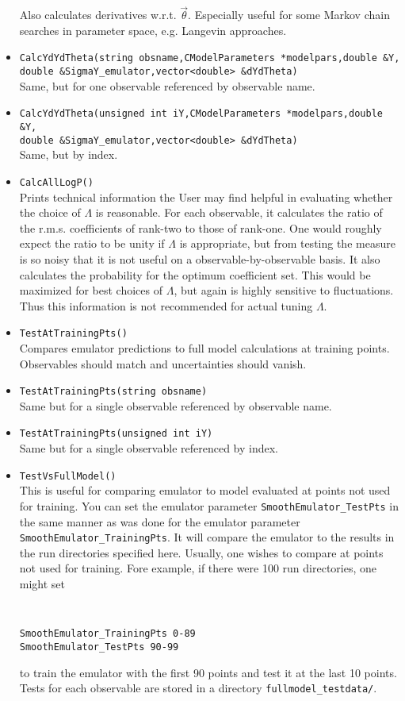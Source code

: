 \documentclass[UserManual.tex]{subfiles}
\begin{document}
\begin{itemize}
Also calculates derivatives w.r.t. $\vec{\theta}$. Especially useful for some Markov chain searches in parameter space, e.g. Langevin approaches.
\item {\tt CalcYdYdTheta(string obsname,CModelParameters *modelpars,double \&Y,\\double \&SigmaY\_emulator,vector<double> \&dYdTheta)}\\
Same, but for one observable referenced by observable name.
\item {\tt CalcYdYdTheta(unsigned int iY,CModelParameters *modelpars,double \&Y,\\double \&SigmaY\_emulator,vector<double> \&dYdTheta)}\\
Same, but by index.
\item {\tt CalcAllLogP()}\\
Prints technical information the User may find helpful in evaluating whether the choice of $\Lambda$ is reasonable. For each observable, it calculates the ratio of the r.m.s. coefficients of rank-two to those of rank-one. One would roughly expect the ratio to be unity if $\Lambda$ is appropriate, but from testing the measure is so noisy that it is not useful on a observable-by-observable basis. It also calculates the probability for the optimum coefficient set. This would be maximized for best choices of $\Lambda$, but again is highly sensitive to fluctuations. Thus this information is not recommended for actual tuning $\Lambda$. 
\item {\tt TestAtTrainingPts()}\\
Compares emulator predictions to full model calculations at training points. Observables should match and uncertainties should vanish.
\item {\tt TestAtTrainingPts(string obsname)}\\
Same but for a single observable referenced by observable name.
\item {\tt TestAtTrainingPts(unsigned int iY)}\\
Same but for a single observable referenced by index.
\item {\tt TestVsFullModel()}\\
This is useful for comparing emulator to model evaluated at points not used for training. You can set the emulator parameter {\tt SmoothEmulator\_TestPts} in the same manner as was done for the emulator parameter {\tt SmoothEmulator\_TrainingPts}. It will compare the emulator to the results in the run directories specified here. Usually, one wishes to compare at points not used for training. Fore example, if there were 100 run directories, one might set
{\tt
\begin{verbatim}
SmoothEmulator_TrainingPts 0-89
SmoothEmulator_TestPts 90-99
\end{verbatim}}
to train the emulator with the first 90 points and test it at the last 10 points. Tests for each observable are stored in a directory {\tt fullmodel\_testdata/}.


\end{itemize}
\end{document}
